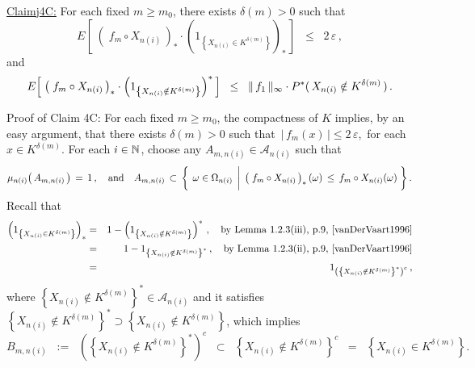 \vskip 0.8cm
\begin{center}\begin{minipage}{6.5in}
\underline{Claim{{\color{white}j}}4C:}\;\;
For each fixed $m \geq m_{0}$, there exists $\delta(m) > 0$ such that
\begin{equation*}
E\!\left[\;
	\left(\;f_{m} \circ X_{n(i)}\,\right)_{*}
	\cdot
	\left(1_{\left\{X_{n(i)} \in K^{\delta(m)}\right\}}\right)_{*}
\,\right]
\;\;\leq\;\; 2\,\varepsilon\,,
\end{equation*}
and
\begin{equation*}
E\!\left[\;
	\left(\;f_{m} \circ X_{n(i)}\,\right)_{*}
	\cdot
	\left(1_{\left\{X_{n(i)} \notin K^{\delta(m)}\right\}}\right)^{*}
\,\right]
\;\;\leq\;\; \Vert\,f_{1}\,\Vert_{\infty} \cdot P^{*}(\,X_{n(i)} \overset{{\color{white}.}}{\notin} K^{\delta(m)}\,)\,.
\end{equation*}
\end{minipage}\end{center}
Proof of Claim 4C:\;\;
For each fixed $m \geq m_{0}$, the compactness of $K$ implies, by an easy argument,
that there exists $\delta(m) > 0$ such that
\,$\vert\,f_{m}(x)\,\vert \leq  2\,\varepsilon$,\, for each \,$x \in K^{\delta(m)}$.
For each $i \in \mathbb{N}$, choose any $A_{m,n(i)} \in \mathcal{A}_{n(i)}$ such that
\begin{equation*}
\mu_{n(i)}\!\left(\,A_{m,n(i)}\,\right) \,=\, 1\,,
\quad\textnormal{and}\quad
A_{m,n(i)} \,\subset\,
\left\{\;
	\left.
	\omega \overset{{\color{white}-}}{\in} \Omega_{n(i)}
	\;\,\right\vert\;
	\left(\;f_{m} \circ X_{n(i)}\,\right)_{*}(\omega) \,\leq\, f_{m} \circ X_{n(i)}(\omega)
\;\right\}.
\end{equation*}
Recall that
\begin{eqnarray*}
\left(1_{\left\{X_{n(i)} \in K^{\delta(m)}\right\}}\right)_{*}
& = &
	1 - \left(1_{\left\{X_{n(i)} \notin K^{\delta(m)}\right\}}\right)^{*}\,,
	\quad
	\textnormal{by Lemma 1.2.3(iii), p.9, \cite{vanDerVaart1996}}
\\
& = &
	1 - 1_{\left\{X_{n(i)} \notin K^{\delta(m)}\right\}^{*}}\,,
	\quad
	\textnormal{by Lemma 1.2.3(ii), p.9, \cite{vanDerVaart1996}}
\\
& = &
	1_{\left(\left\{X_{n(i)} \notin K^{\delta(m)}\right\}^{*}\right)^{c}}\,,
\end{eqnarray*}
where $\left\{X_{n(i)} \notin K^{\delta(m)}\right\}^{*} \in \mathcal{A}_{n(i)}$
and it satisfies 
$\left\{X_{n(i)} \notin K^{\delta(m)}\right\}^{*} \supset \left\{X_{n(i)} \notin K^{\delta(m)}\right\}$,
which implies
\begin{equation*}
B_{m,n(i)}
\;\; :=	 \;\;
	\left(\left\{X_{n(i)} \notin K^{\delta(m)}\right\}^{*}\right)^{c}
\;\; \subset \;\;
	\left\{X_{n(i)} \notin K^{\delta(m)}\right\}^{c}
\;\; = \;\;
	\left\{X_{n(i)} \in K^{\delta(m)}\right\}.
\end{equation*}
